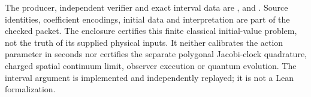 The producer, independent verifier and exact interval data are
,
 and
.
Source identities, coefficient encodings, initial data and interpretation
are part of the checked packet. The enclosure certifies this finite
classical initial-value problem, not the truth of its supplied physical
inputs. It neither calibrates the action parameter in seconds nor certifies
the separate polygonal Jacobi-clock quadrature, charged spatial continuum
limit, observer execution or quantum evolution. The interval argument is
implemented and independently replayed; it is not a Lean formalization.
